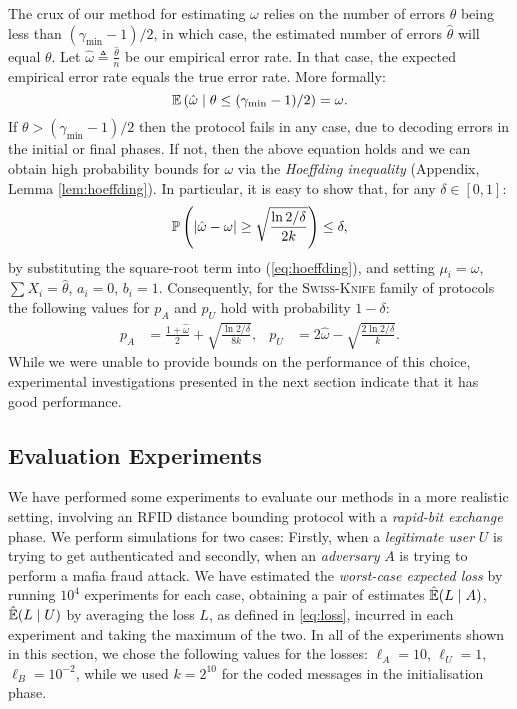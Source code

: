 \documentclass[a4paper]{article}
\newcommand \defn {\mathrel{\triangleq}}
\renewcommand\Pr{\mathop{\mbox{\ensuremath{\mathbb{P}}}}\nolimits}
\newcommand\E{\mathop{\mbox{\ensuremath{\mathbb{E}}}}\nolimits}
\newcommand \noise {\omega}
\newcommand \loss {L}
\newcommand \pa {p_A}
\newcommand \pu {p_U}
\newcommand \LA {\ell_A}
\newcommand \LU {\ell_U}
\newcommand \LB {\ell_B}
\newcommand \minmetric {\gamma_{\min}}
\newcommand \Swiss {\textsc{Swiss-Knife}}
\theoremstyle{plain} \newtheorem{remark}{Remark}
\theoremstyle{plain} \newtheorem{definition}{Definition}
\theoremstyle{plain} \newtheorem{example}{Example}
\theoremstyle{plain} \newtheorem{assumption}{Assumption}
\theoremstyle{plain} \newtheorem{conjecture}{Conjecture}
\theoremstyle{plain} \newtheorem{theorem}{Theorem}
\theoremstyle{plain} \newtheorem{proposition}{Proposition}
\theoremstyle{plain} \newtheorem{lemma}{Lemma}
\theoremstyle{plain} \newtheorem{corollary}{Corollary}
\begin{document}
The crux of our method for estimating $\omega$ relies on the number of
errors $\theta$ being less than $(\minmetric - 1)/2$, in which case, the
estimated number of errors $\hat{\theta}$ will equal $\theta$.  Let
$\hat{\noise} \defn \frac{\hat{\theta}}{n}$ be our empirical error rate.
In that case, the expected empirical error rate equals the true error
rate. More formally:
\begin{equation}
  \label{eq:erorr-rate-estimate}
  \E\left(\hat{\noise} \mid
    \theta \leq (\minmetric - 1)/2 \right)
  =
  \noise.
\end{equation}
If $\theta > (\minmetric - 1)/2$ then the protocol fails in any case, due
to decoding errors in the initial or final phases.  If not, then the
above equation holds and we can obtain high probability bounds for
$\omega$ via the \textit{Hoeffding inequality} (Appendix,  Lemma \ref{lem:hoeffding}).  In particular, it is easy to
show that, for any $\delta \in [0, 1]$:
\begin{equation}
  \label{eq:high-probability-bound}
  \Pr\left(|\hat{\noise} - \noise| \geq \sqrt{\frac{\ln2/\delta}{2k}}\right)
  \leq \delta,
\end{equation}
by substituting the square-root term into (\ref{eq:hoeffding}), and
setting $\mu_i = \noise$, $\sum X_i = \hat{\theta}$, $a_i = 0$, $b_i=1$.
Consequently, for the {\Swiss} family of protocols the following
values for $\pa$ and $\pu$ hold with probability $1 - \delta$:
\begin{align}
  \label{eq:pa-hp}
  \pa &= \frac{1 + \hat{\noise}}{2}
  + \sqrt{\frac{\ln2/\delta}{8k}},
  &
  \pu &= 2\hat{\noise}
  - \sqrt{\frac{2\ln2/\delta}{k}}.
\end{align}
While we were unable to provide bounds on the performance of this
choice, experimental investigations presented in the next section
indicate that it has good performance.


\subsection{Evaluation Experiments}
We have performed some experiments to evaluate our methods in a more
realistic setting, involving an RFID distance bounding protocol with a
\textit{rapid-bit exchange} phase.  We perform simulations for two
cases: Firstly, when a \textit{legitimate user} $U$ is trying to get
authenticated and secondly, when an \textit{adversary} $A$ is trying
to perform a mafia fraud attack.  We have estimated the
\textit{worst-case expected loss} by running $10^4$ experiments for
each case, obtaining a pair of estimates $\hat{\E}(\loss \mid A)$,
$\hat{\E}(\loss \mid U)$ by averaging the loss $L$, as defined in
\eqref{eq:loss}, incurred in each experiment and taking the maximum of
the two.  In all of the experiments shown in this section, we chose
the following values for the losses: $\LA = 10$, $\LU = 1$, $\LB =
10^{-2}$, while we used $k=2^{10}$ for the coded messages in the
initialisation phase.
\end{document}
